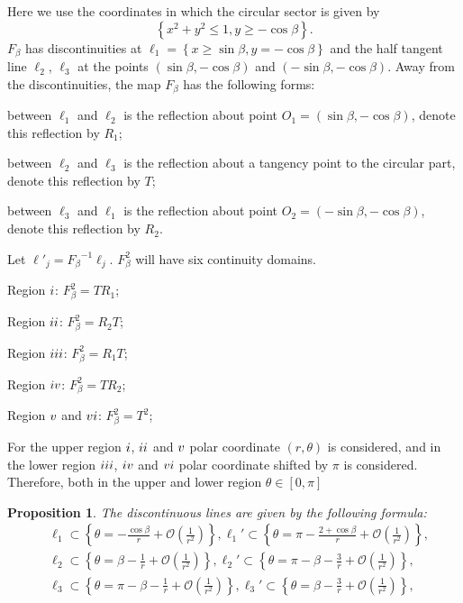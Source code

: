 \documentclass{article}
\def \Rsix{\uppercase\expandafter{\romannumeral6}}
\numberwithin{figure}{section}
\numberwithin{equation}{section}
\newtheorem{proposition}[lemma]{Proposition}
\theoremstyle{remark}
\theoremstyle{definition}
\begin{document}
Here we use the coordinates in which the circular sector is given by
$$\left\{ x^2+y^2\leq1, y\geq -\cos\beta \right\}.$$
$F_\beta$ has discontinuities at $\ell_1=\left\{x\geq \sin\beta ,y=-\cos\beta \right\}$ and the half tangent line $\ell_2$, $\ell_3$ at the points $\left(\sin\beta, -\cos\beta\right)$ and $\left(-\sin\beta, -\cos\beta \right)$. Away from the discontinuities, the map $F_\beta$ has the following forms:

between $\ell_1$ and $\ell_2$ is the reflection about point $O_1=\left(\sin\beta, -\cos\beta\right)$, denote this reflection by $R_1$;

between $\ell_2$ and $\ell_3$ is the reflection about a tangency point to the circular part, denote this reflection by $T$;

between $\ell_3$ and $\ell_1$ is the reflection about point $O_2=\left(-\sin\beta, -\cos\beta\right)$, denote this reflection by $R_2$.

Let $\ell'_j={F_\beta}^{-1}\ell_j$. $F_\beta^2$ will have six continuity domains.

Region $\uppercase\expandafter{\romannumeral1}$: $F_\beta^2=TR_1$;

Region $\uppercase\expandafter{\romannumeral2}$: $F_\beta^2=R_2T$;

Region $\uppercase\expandafter{\romannumeral3}$: $F_\beta^2=R_1T$;

Region $\uppercase\expandafter{\romannumeral4}$: $F_\beta^2=TR_2$;

Region $\uppercase\expandafter{\romannumeral5}$ and $\Rsix$: $F_\beta^2=T^2$;

For the upper region $\uppercase\expandafter{\romannumeral1}$,  $\uppercase\expandafter{\romannumeral2}$ and $\uppercase\expandafter{\romannumeral5}$  polar coordinate $\left(r,\theta\right)$ is considered, and in the lower region $\uppercase\expandafter{\romannumeral3}$,  $\uppercase\expandafter{\romannumeral4}$ and $\uppercase\expandafter{\romannumeral6}$ polar coordinate shifted by $\pi$ is considered. Therefore, both in the upper and lower region $\theta \in \left[0,\pi\right]$

\begin{proposition}\label{prop3}
	The discontinuous lines are given by the following formula:
	\begin{align*}
		&\ell_1\subset \left\{\theta=-\frac{\cos\beta}{r}+\mathcal{O}\left(\frac{1}{r^2}\right)\right\}, \ell_1'\subset \left\{\theta=\pi-\frac{2+\cos\beta}{r}+\mathcal{O}\left(\frac{1}{r^2}\right)\right\}, \\
		&\ell_2\subset \left\{\theta=\beta-\frac{1}{r}+\mathcal{O}\left(\frac{1}{r^2}\right)\right\}, \ell_2'\subset \left\{\theta=\pi-\beta-\frac{3}{r}+\mathcal{O}\left(\frac{1}{r^2}\right)\right\}, \\
		&\ell_3\subset \left\{\theta=\pi-\beta-\frac{1}{r}+\mathcal{O}\left(\frac{1}{r^2}\right)\right\}, \ell_3'\subset \left\{\theta=\beta-\frac{3}{r}+\mathcal{O}\left(\frac{1}{r^2}\right)\right\}, \\
	\end{align*}
\end{proposition}
\end{document}
